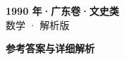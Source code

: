 \documentclass[zihao=-4, a4paper]{ctexart}
\begin{document}
\begin{center}
  {\Large\bfseries 1990 年·广东卷·文史类}\\[4pt]
  {\large 数学 · 解析版}
\end{center}
\medskip
{}

\clearpage
{}
\begin{center}{\Large\bfseries 参考答案与详细解析}\end{center}
\medskip

\end{document}
